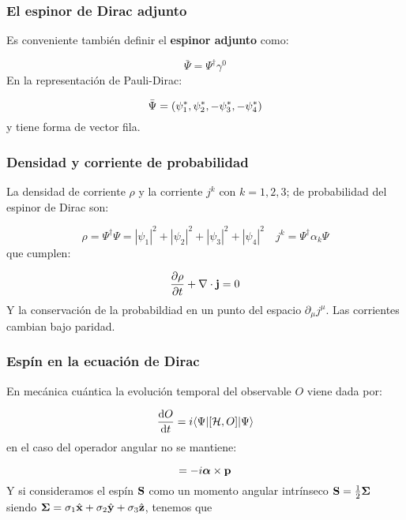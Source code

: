  

\subsubsection{El espinor de Dirac adjunto}
Es conveniente también definir el \textbf{espinor adjunto} como:

\begin{equation}
	\bar{\Psi} = \Psi^\dagger \gamma^0
\end{equation}
En la representación de Pauli-Dirac:

\begin{equation}
	\bar{\Psi}=\left( \psi_1^*,\psi_2^*,-\psi_3^*,-\psi_4^* \right)
\end{equation}
y tiene forma de vector fila.

\subsubsection{Densidad y corriente de probabilidad}

La densidad de corriente $\rho$ y la corriente $j^k$ con $k=1,2,3$; de probabilidad del espinor de Dirac son:

\begin{equation}
	\rho = \Psi^\dagger \Psi = |\psi_1|^2 +|\psi_2|^2+|\psi_3|^2+|\psi_4|^2 \quad j^k = \Psi^\dagger \alpha_k \Psi
\end{equation}
que cumplen:

\begin{equation}
	\frac{\partial \rho}{\partial t} + \nabla \cdot \mathbf{j} = 0
\end{equation}
Y la conservación de la probabildiad en un punto del espacio $\partial_\mu j^\mu$. Las corrientes cambian bajo paridad. 

\subsubsection{Espín en la ecuación de Dirac}

En mecánica cuántica la evolución temporal del observable $O$ viene dada por:

\begin{equation}
	\frac{\mathrm{d} O}{\mathrm{d} t} = i \langle \Psi | [\mathcal{H},O] |\Psi \rangle
\end{equation}
en el caso del operador angular no se mantiene:

\begin{equation}
	[\Hcal,\Ln] = - i \alphan  \times \pn
\end{equation}
Y si consideramos el espín $\mathbf{S}$ como un momento angular intrínseco $\mathbf{S} = \frac{1}{2}\boldsymbol{\Sigma}$ siendo $\boldsymbol{\Sigma}=\sigma_1\hat{\mathbf{x}}+\sigma_2\hat{\mathbf{y}}+\sigma_3 \hat{\mathbf{z}}$, tenemos que

